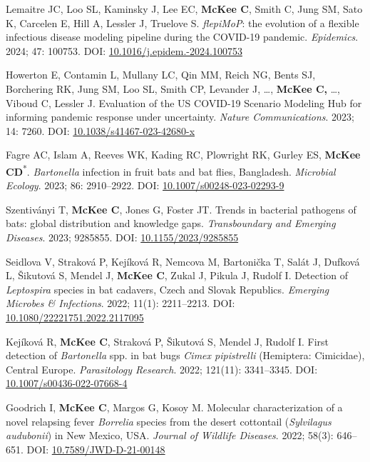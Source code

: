 \documentclass{cv}
\begin{document}
\begin{pubenum}
\item Lemaitre JC, Loo SL, Kaminsky J, Lee EC, \textbf{McKee C}, Smith C, Jung SM, Sato K, Carcelen E, Hill A, Lessler J, Truelove S. \textit{flepiMoP}: the evolution of a flexible infectious disease modeling pipeline during the COVID-19 pandemic. \textit{Epidemics}. 2024; 47: 100753. DOI: \href{https://doi.org/10.1016/j.epidem.2024.100753}{10.1016/j.epidem.-2024.100753}

\item Howerton E, Contamin L, Mullany LC, Qin MM, Reich NG, Bents SJ, Borchering RK, Jung SM, Loo SL, Smith CP, Levander J, …, \textbf{McKee C,} …, Viboud C, Lessler J. Evaluation of the US COVID-19 Scenario Modeling Hub for informing pandemic response under uncertainty. \textit{Nature Communications}. 2023; 14: 7260. DOI: \href{https://doi.org/10.1038/s41467-023-42680-x}{10.1038/s41467-023-42680-x}

\item Fagre AC, Islam A, Reeves WK, Kading RC, Plowright RK, Gurley ES, \textbf{McKee CD}\textsuperscript{*}. \textit{Bartonella} infection in fruit bats and bat flies, Bangladesh. \textit{Microbial Ecology}. 2023; 86: 2910--2922. DOI: \href{https://doi.org/10.1007/s00248-023-02293-9}{10.1007/s00248-023-02293-9}

\item Szentiványi T, \textbf{McKee C}, Jones G, Foster JT. Trends in bacterial pathogens of bats: global distribution and knowledge gaps. \textit{Transboundary and Emerging Diseases}. 2023; 9285855. DOI: \href{https://doi.org/10.1155/2023/9285855}{10.1155/2023/9285855}

\item Seidlova V, Straková P, Kejíková R, Nemcova M, Bartonička T, Salát J, Dufková L, Šikutová S, Mendel J, \textbf{McKee C}, Zukal J, Pikula J, Rudolf I. Detection of \textit{Leptospira} species in bat cadavers, Czech and Slovak Republics. \textit{Emerging Microbes \& Infections}. 2022; 11(1): 2211--2213. DOI: \href{https://doi.org/10.1080/22221751.2022.2117095}{10.1080/22221751.2022.2117095}

\item Kejíková R, \textbf{McKee C}, Straková P, Šikutová S, Mendel J, Rudolf I. First detection of \textit{Bartonella} spp. in bat bugs \textit{Cimex pipistrelli} (Hemiptera: Cimicidae), Central Europe. \textit{Parasitology Research}. 2022; 121(11): 3341--3345. DOI: \href{https://doi.org/10.1007/s00436-022-07668-4}{10.1007/s00436-022-07668-4}

\item Goodrich I, \textbf{McKee C}, Margos G, Kosoy M. Molecular characterization of a novel relapsing fever \textit{Borrelia} species from the desert cottontail (\textit{Sylvilagus audubonii}) in New Mexico, USA. \textit{Journal of Wildlife Diseases}. 2022; 58(3): 646--651. DOI: \href{https://doi.org/10.7589/JWD-D-21-00148}{10.7589/JWD-D-21-00148}


\end{pubenum}
\end{document}
